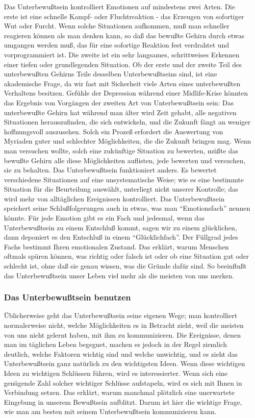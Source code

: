 Das Unterbewußtsein kontrolliert Emotionen auf mindestens zwei Arten.
Die erste ist eine schnelle Kampf- oder Fluchtreaktion - das Erzeugen von sofortiger Wut oder Furcht.
Wenn solche Situationen aufkommen, muß man schneller reagieren können als man denken kann, so daß das bewußte Gehirn durch etwas umgangen werden muß, das für eine sofortige Reaktion fest verdrahtet und vorprogrammiert ist.
Die zweite ist ein sehr langsames, schrittweises Erkennen einer tiefen oder grundlegenden Situation.
Ob der erste und der zweite Teil des unterbewußten Gehirns Teile desselben Unterbewußtseins sind, ist eine akademische Frage, da wir fast mit Sicherheit viele Arten eines unterbewußten Verhaltens besitzen.
Gefühle der Depression während einer Midlife-Krise könnten das Ergebnis von Vorgängen der zweiten Art von Unterbewußtsein sein: Das unterbewußte Gehirn hat während man älter wird Zeit gehabt, alle negativen Situationen herauszufinden, die sich entwickeln, und die Zukunft fängt an weniger hoffnungsvoll auszusehen.
Solch ein Prozeß erfordert die Auswertung von Myriaden guter und schlechter Möglichkeiten, die die Zukunft bringen mag.
Wenn man versuchen wollte, solch eine zukünftige Situation zu bewerten, müßte das bewußte Gehirn alle diese Möglichkeiten auflisten, jede bewerten und versuchen, sie zu behalten.
Das Unterbewußtsein funktioniert anders.
Es bewertet verschiedene Situationen auf eine unsystematische Weise; wie es eine bestimmte Situation für die Beurteilung auswählt, unterliegt nicht unserer Kontrolle; das wird mehr von alltäglichen Ereignissen kontrolliert.
Das Unterbewußtsein speichert seine Schlußfolgerungen auch in etwas, was man \enquote{Emotionsfach} nennen könnte.
Für jede Emotion gibt es ein Fach und jedesmal, wenn das Unterbewußtsein zu einem Entschluß kommt, sagen wir zu einem glücklichen, dann deponiert es den Entschluß in einem \enquote{Glücklichfach}.
Der Füllgrad jedes Fachs bestimmt Ihren emotionalen Zustand.
Das erklärt, warum Menschen oftmals spüren können, was richtig oder falsch ist oder ob eine Situation gut oder schlecht ist, ohne daß sie genau wissen, was die Gründe dafür sind.
So beeinflußt das Unterbewußtsein unser Leben viel mehr als die meisten von uns merken.


\subsubsection{Das Unterbewußtsein benutzen}
\label{c3_6c}

Üblicherweise geht das Unterbewußtsein seine eigenen Wege; man kontrolliert normalerweise nicht, welche Möglichkeiten es in Betracht zieht, weil die meisten von uns nicht gelernt haben, mit ihm zu kommunizieren.
Die Ereignisse, denen man im täglichen Leben begegnet, machen es jedoch in der Regel ziemlich deutlich, welche Faktoren wichtig sind und welche unwichtig, und es zieht das Unterbewußtsein ganz natürlich zu den wichtigsten Ideen.
Wenn diese wichtigen Ideen zu wichtigen Schlüssen führen, wird es interessierter.
Wenn sich eine genügende Zahl solcher wichtiger Schlüsse aufstapeln, wird es sich mit Ihnen in Verbindung setzen.
Das erklärt, warum manchmal plötzlich eine unerwartete Eingebung in unserem Bewußtsein aufblitzt.
Darum ist hier die wichtige Frage, wie man am besten mit seinem Unterbewußtsein kommunizieren kann.

